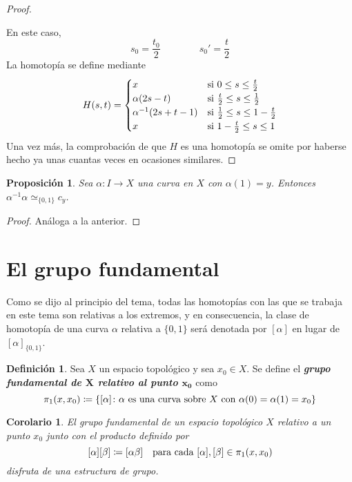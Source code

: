\documentclass[11pt]{report}
\newenvironment{cdefinition} %
  {\begin{mdframed}[innertopmargin = 0pt,
                    innerbottommargin = 7.5pt,
                    backgroundcolor = lightgray!10,
                    linewidth = 1pt,
                    shadow = true,
                    shadowsize = 5pt,
                    roundcorner = 0pt,
                    skipabove = 0pt]
    \begin{definition}}
  {\end{definition}\end{mdframed}}
\newenvironment{ccorollary} %
  {\begin{mdframed}[innertopmargin = 0pt,
                    innerbottommargin = 7.5pt,
                    backgroundcolor = lightgray!10,
                    linewidth = 1pt,
                    shadow = true,
                    shadowsize = 5pt,
                    roundcorner = 0pt,
                    skipabove = 0pt]
    \begin{corollary}}
  {\end{corollary}\end{mdframed}}
\newtheorem{proposition}{Proposición}[chapter]
\newtheorem{corollary}{Corolario}[chapter]
\theoremstyle{definition}
\newtheorem{definition}{Definición}[chapter]
\theoremstyle{definition}
\theoremstyle{remark}
\begin{document}
\begin{proof}
\begin{center}
\begin{tikzpicture}
\end{tikzpicture}
\end{center}
En este caso,
\[s_0 = \frac{t_0}{2} \qquad \qquad s_0'=\frac{t}{2}\]
La homotopía se define mediante
\[H(s,t) = \begin{cases}
    x & $si$ \ 0 \leq s \leq \frac{t}{2} \\
    \alpha(2s-t) & $si$ \ \frac{t}{2} \leq s \leq \frac{1}{2} \\
    \alpha^{-1}(2s+t-1) & $si$ \ \frac{1}{2} \leq s \leq 1-\frac{t}{2} \\
    x & $si$ \ 1-\frac{t}{2} \leq s \leq 1
\end{cases}\]
Una vez más, la comprobación de que $H$ es una homotopía se omite por haberse hecho ya unas cuantas veces en ocasiones similares.
\end{proof}

\begin{proposition}
\label{prop2.6.}
Sea $\alpha \colon I \to X$ una curva en $X$ con $\alpha(1) = y$. Entonces $\alpha^{-1}\alpha \simeq_{\{0,1\}} c_y$.
\end{proposition}

\begin{proof}
Análoga a la anterior.
\end{proof}

\section{El grupo fundamental}

Como se dijo al principio del tema, todas las homotopías con las que se trabaja en este tema son relativas a los extremos, y en consecuencia, la clase de homotopía de una curva $\alpha$ relativa a $\{0,1\}$ será denotada por $[\alpha]$ en lugar de $[\alpha]_{\{0,1\}}$.

\hfill

\begin{cdefinition}
Sea $X$ un espacio topológico y sea $x_0 \in X$. Se define el \textbf{\textit{grupo fundamental de $\bm{X}$ relativo al punto $\bm{x_0}$}} como
\[\pi_1(x,x_0) \coloneqq \{[\alpha] \colon \alpha \textup{ es una curva sobre } X \textup{ con }\alpha(0)=\alpha(1)=x_0\}\]
\end{cdefinition}

\begin{ccorollary}
El grupo fundamental de un espacio topológico $X$ relativo a un punto $x_0$ junto con el producto definido por
\[[\alpha][\beta] \coloneqq [\alpha\beta] \quad \textup{para cada } [\alpha], [\beta] \in \pi_1(x,x_0)\]
disfruta de una estructura de grupo.
\end{ccorollary}
\end{document}
